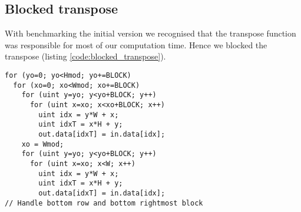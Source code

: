 \subsection{Blocked transpose}
With benchmarking the initial version we recognised that the transpose function was responsible for most of our computation time. Hence we blocked the transpose (listing \ref{code:blocked_transpose}).
\begin{lstlisting}[caption=Transpose block, label=code:blocked_transpose]
for (yo=0; yo<Hmod; yo+=BLOCK)
  for (xo=0; xo<Wmod; xo+=BLOCK)
    for (uint y=yo; y<yo+BLOCK; y++)
      for (uint x=xo; x<xo+BLOCK; x++)
        uint idx = y*W + x;
        uint idxT = x*H + y;
        out.data[idxT] = in.data[idx];
    xo = Wmod;
    for (uint y=yo; y<yo+BLOCK; y++)
      for (uint x=xo; x<W; x++)
        uint idx = y*W + x;
        uint idxT = x*H + y;
        out.data[idxT] = in.data[idx];
// Handle bottom row and bottom rightmost block
\end{lstlisting}



%
%
%
%
